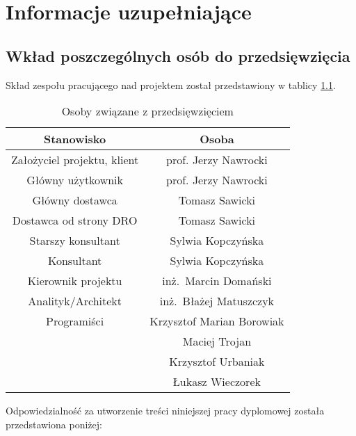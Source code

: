 \chapter{Informacje uzupełniające}
\label{Chapter10}

\section{Wkład poszczególnych osób do przedsięwzięcia}
\label{Chapter101}

Skład zespołu pracującego nad projektem został przedstawiony w tablicy \ref{tab:roster}.

\begin{table}[H]
\centering
\begin{tabular}{ | c | c | }
\hline
\textbf{Stanowisko} & \textbf{Osoba} \\ \hline
Założyciel projektu, klient & prof. Jerzy Nawrocki \\ \hline
Główny użytkownik & prof. Jerzy Nawrocki \\ \hline
Główny dostawca & Tomasz Sawicki \\ \hline
Dostawca od strony DRO & Tomasz Sawicki \\ \hline
Starszy konsultant & Sylwia Kopczyńska \\ \hline
Konsultant & Sylwia Kopczyńska \\ \hline
Kierownik projektu & inż.~Marcin Domański \\ \hline
Analityk/Architekt & inż.~Błażej Matuszczyk \\ \hline
Programiści & Krzysztof Marian Borowiak \\ 
 & Maciej Trojan \\ 
 & Krzysztof Urbaniak \\ 
 & Łukasz Wieczorek \\
\hline
\end{tabular}
\caption{Osoby związane z przedsięwzięciem}\label{tab:roster}
\end{table}

\noindent
Odpowiedzialność za utworzenie treści niniejszej pracy dyplomowej została przedstawiona poniżej:

